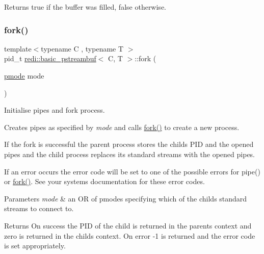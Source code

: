 \begin{DoxyReturn}{Returns}
true if the buffer was filled, false otherwise. 
\end{DoxyReturn}
\mbox{\label{classredi_1_1basic__pstreambuf_a70a3b8c71fa2019eefff0ef6e8a92d5b}} 
\subsubsection{\texorpdfstring{fork()}{fork()}}
{\footnotesize\ttfamily template$<$typename C , typename T $>$ \\
pid\+\_\+t \mbox{\hyperlink{classredi_1_1basic__pstreambuf}{redi\+::basic\+\_\+pstreambuf}}$<$ C, T $>$\+::fork (\begin{DoxyParamCaption}\item[{\mbox{\hyperlink{structredi_1_1pstreams_a1eae4aad88812af03a0fbb3ec13c50b7}{pmode}}}]{mode }\end{DoxyParamCaption})\hspace{0.3cm}{\ttfamily [protected]}}



Initialise pipes and fork process. 

Creates pipes as specified by {\itshape mode} and calls {\ttfamily \mbox{\hyperlink{classredi_1_1basic__pstreambuf_a70a3b8c71fa2019eefff0ef6e8a92d5b}{fork()}}} to create a new process.

If the fork is successful the parent process stores the child\textquotesingle{}s P\+ID and the opened pipes and the child process replaces its standard streams with the opened pipes.

If an error occurs the error code will be set to one of the possible errors for {\ttfamily pipe()} or {\ttfamily \mbox{\hyperlink{classredi_1_1basic__pstreambuf_a70a3b8c71fa2019eefff0ef6e8a92d5b}{fork()}}}. See your system\textquotesingle{}s documentation for these error codes.


\begin{DoxyParams}{Parameters}
{\em mode} & an OR of pmodes specifying which of the child\textquotesingle{}s standard streams to connect to. \\
\hline
\end{DoxyParams}
\begin{DoxyReturn}{Returns}
On success the P\+ID of the child is returned in the parent\textquotesingle{}s context and zero is returned in the child\textquotesingle{}s context. On error -\/1 is returned and the error code is set appropriately. 
\end{DoxyReturn}
\mbox{\label{classredi_1_1basic__pstreambuf_af28fab6dc978b25c92740400512a61bc}} 
